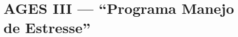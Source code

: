 \chapter[AGES III --- “Programa Manejo de Estresse”]{AGES III --- “Programa Manejo de Estresse”}




